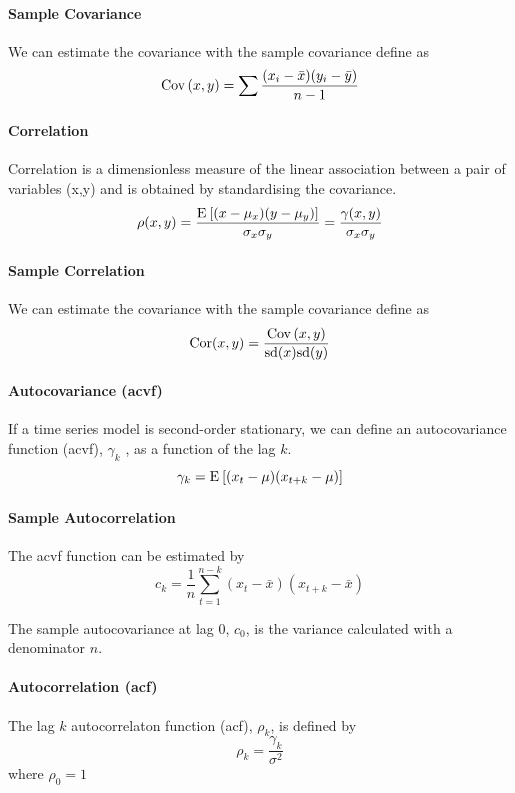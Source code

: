 \paragraph{Sample Covariance}
We can estimate the covariance with the sample covariance define as
\[ \mathrm{Cov} \left( x, y \right) = \sum \frac{(x_i - \bar{x})(y_i - \bar{y})}{n-1} \]

\paragraph{Correlation}
Correlation is a dimensionless measure of the linear association between a pair of variables (x,y) and is obtained by standardising the covariance.
\[ \rho(x, y) = \frac{\mathrm{E}_{} \left[ (x-\mu_x)(y-\mu_y) \right]}{\sigma_x \sigma_y} = \frac{\gamma(x,y)}{\sigma_x \sigma_y} \]
 
\paragraph{Sample Correlation}
We can estimate the covariance with the sample covariance define as
\[ \mathrm{Cor}(x, y) = \frac{\mathrm{Cov} \left( x, y \right)}{\mathrm{sd}(x)\mathrm{sd}(y)} \]

\paragraph{Autocovariance (acvf)}
If a time series model is second-order stationary, we can define an autocovariance function (acvf), $\gamma_k$ , as a function of the lag $k$.
\[ \gamma_k = \mathrm{E}_{} \left[ (x_t-\mu)(x_{t+k}-\mu) \right] \]

\paragraph{Sample Autocorrelation}
The acvf function can be estimated by
\[ c_k = \frac{1}{n} \sum_{t=1}^{n-k} (x_t - \bar{x})(x_{t+k} - \bar{x}) \]

\begin{note}
The sample autocovariance at lag 0, $c_0$, is the variance calculated with a denominator $n$. 
\end{note}

\paragraph{Autocorrelation (acf)}
The lag $k$ autocorrelaton function (acf), $\rho_k$, is defined by
\[ \rho_k = \frac{\gamma_k}{\sigma^2} \]
where $\rho_0 = 1$

